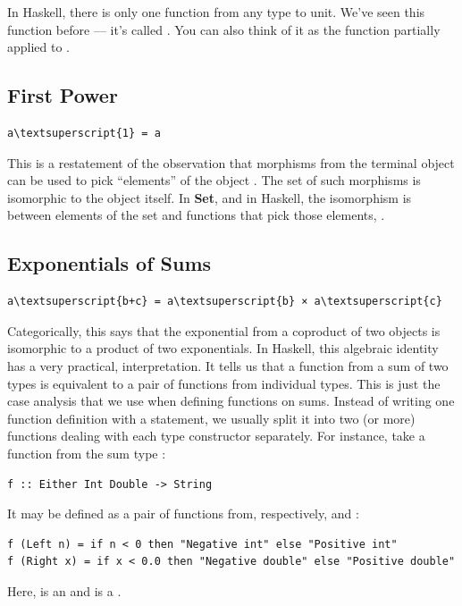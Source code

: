 In Haskell, there is only one function from any type  to unit.
We've seen this function before --- it's called . You can
also think of it as the function  partially applied to
\code{()}.

\subsection{First Power}\label{first-power}

\begin{Verbatim}[commandchars=\\\{\}]
a\textsuperscript{1} = a
\end{Verbatim}
This is a restatement of the observation that morphisms from the
terminal object can be used to pick ``elements'' of the object
. The set of such morphisms is isomorphic to the object
itself. In \textbf{Set}, and in Haskell, the isomorphism is between
elements of the set  and functions that pick those elements,
.

\subsection{Exponentials of Sums}\label{exponentials-of-sums}

\begin{Verbatim}[commandchars=\\\{\}]
a\textsuperscript{b+c} = a\textsuperscript{b} × a\textsuperscript{c}
\end{Verbatim}
Categorically, this says that the exponential from a coproduct of two
objects is isomorphic to a product of two exponentials. In Haskell, this
algebraic identity has a very practical, interpretation. It tells us
that a function from a sum of two types is equivalent to a pair of
functions from individual types. This is just the case analysis that we
use when defining functions on sums. Instead of writing one function
definition with a  statement, we usually split it into two
(or more) functions dealing with each type constructor separately. For
instance, take a function from the sum type
:

\begin{verbatim}
f :: Either Int Double -> String
\end{verbatim}
It may be defined as a pair of functions from, respectively,
 and :

\begin{verbatim}
f (Left n) = if n < 0 then "Negative int" else "Positive int"
f (Right x) = if x < 0.0 then "Negative double" else "Positive double"
\end{verbatim}
Here,  is an  and  is a .

